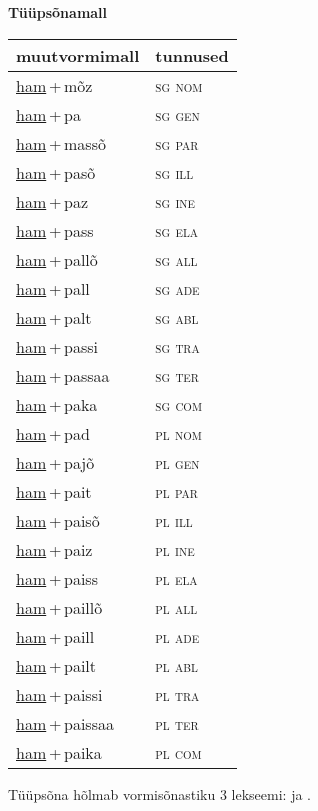 
\vspace{1.8em}
\begin{minipage}{\textwidth}
\textbf{Tüüpsõnamall \,}\\

\begin{sideways}
\begin{tabular}{l l}
muutvormimall & tunnused \\
\hline
\underline{ham}\,+\,mõz & \textsc{ sg nom } \\
\underline{ham}\,+\,pa & \textsc{ sg gen } \\
\underline{ham}\,+\,massõ & \textsc{ sg par } \\
\underline{ham}\,+\,pasõ & \textsc{ sg ill } \\
\underline{ham}\,+\,paz & \textsc{ sg ine } \\
\underline{ham}\,+\,pass & \textsc{ sg ela } \\
\underline{ham}\,+\,pallõ & \textsc{ sg all } \\
\underline{ham}\,+\,pall & \textsc{ sg ade } \\
\underline{ham}\,+\,palt & \textsc{ sg abl } \\
\underline{ham}\,+\,passi & \textsc{ sg tra } \\
\underline{ham}\,+\,passaa & \textsc{ sg ter } \\
\underline{ham}\,+\,paka & \textsc{ sg com } \\
\underline{ham}\,+\,pad & \textsc{ pl nom } \\
\underline{ham}\,+\,pajõ & \textsc{ pl gen } \\
\underline{ham}\,+\,pait & \textsc{ pl par } \\
\underline{ham}\,+\,paisõ & \textsc{ pl ill } \\
\underline{ham}\,+\,paiz & \textsc{ pl ine } \\
\underline{ham}\,+\,paiss & \textsc{ pl ela } \\
\underline{ham}\,+\,paillõ & \textsc{ pl all } \\
\underline{ham}\,+\,paill & \textsc{ pl ade } \\
\underline{ham}\,+\,pailt & \textsc{ pl abl } \\
\underline{ham}\,+\,paissi & \textsc{ pl tra } \\
\underline{ham}\,+\,paissaa & \textsc{ pl ter } \\
\underline{ham}\,+\,paika & \textsc{ pl com } \\
\end{tabular}
\end{sideways}
\label{tab:tüüpsõnamall-hammõz}

\end{minipage}

 
\vspace{1em}
\noindent Tüüpsõna hõlmab vormisõnastiku 3 lekseemi:  ja .
